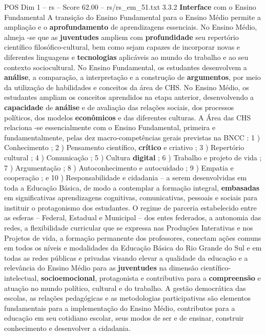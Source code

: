 \begin{textsample}{POS Dim 1 – rs – Score 62.00 – rs/rs\_em\_51.txt}  \label{ex:f1_pos_202}
3.3.2 \textbf{Interface} com o Ensino Fundamental A transição do Ensino Fundamental para o Ensino Médio permite a ampliação e o \textbf{aprofundamento} de aprendizagens essenciais.
No Ensino Médio, almeja -se que as \textbf{juventudes} ampliem com \textbf{profundidade} seu repertório científico filosófico-cultural, bem como sejam capazes de incorporar novas e diferentes linguagens e \textbf{tecnologias} aplicáveis ao mundo do trabalho e ao seu contexto sociocultural.
No Ensino Fundamental, os estudantes desenvolvem a \textbf{análise}, a comparação, a interpretação e a construção de \textbf{argumentos}, por meio da utilização de habilidades e conceitos da área de CHS.
No Ensino Médio, os estudantes ampliam os conceitos aprendidos na etapa anterior, desenvolvendo a \textbf{capacidade} de \textbf{análise} e de avaliação das relações sociais, dos processos políticos, dos modelos \textbf{econômicos} e das diferentes culturas.
A Área das CHS relaciona -se essencialmente com o Ensino Fundamental, primeira e fundamentalmente, pelas dez macro-competências gerais previstas na BNCC : 1 ) Conhecimento ; 2 ) Pensamento científico, \textbf{crítico} e criativo ; 3 ) Repertório cultural ; 4 ) Comunicação ; 5 ) Cultura \textbf{digital} ; 6 ) Trabalho e projeto de vida ; 7 ) Argumentação ; 8 ) Autoconhecimento e autocuidado ; 9 ) Empatia e cooperação ; e 10 ) Responsabilidade e cidadania – a serem desenvolvidas em toda a Educação Básica, de modo a contemplar a formação integral, \textbf{embasadas} em significativas aprendizagens cognitivas, comunicativas, pessoais e sociais para instituir o protagonismo dos estudantes.
O regime de parceria estabelecido entre as esferas – Federal, Estadual e Municipal – dos entes federados, a autonomia das redes, a flexibilidade curricular que se expressa nas Produções Interativas e nos Projetos de vida, a formação permanente dos professores, conectam ações comuns em todos os níveis e modalidades da Educação Básica do Rio Grande do Sul e em todas as redes públicas e privadas visando elevar a qualidade da educação e a relevância do Ensino Médio para as \textbf{juventudes} na dimensão científico-intelectual, \textbf{socioemocional}, protagonista e contributiva para a \textbf{compreensão} e atuação no mundo político, cultural e do trabalho.
A gestão democrática das escolas, as relações pedagógicas e as metodologias participativas são elementos fundamentais para a implementação do Ensino Médio, contributos para a educação em seu cotidiano escolar, seus modos de ser e de ensinar, construir conhecimento e desenvolver a cidadania.

\end{textsample}
